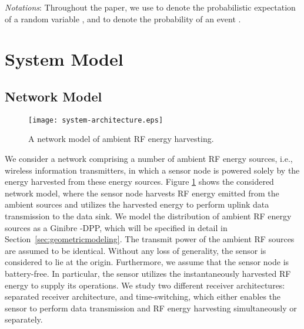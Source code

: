 \documentclass[12pt,draftclsnofoot,onecolumn]{IEEEtran}
\begin{document}
{\em Notations}: Throughout the paper, we use  to denote the probabilistic expectation of a random variable , and  to denote the probability of an event . 


\section{System Model}
\label{sec:systemmodel}





\subsection{Network Model}
\label{sec:network_model}

\begin{figure}
\centering
\texttt{[image: system-architecture.eps]}
\caption{A network model of ambient RF energy harvesting.} \label{fig:systemmodel}
\end{figure}






We consider a network comprising a number of ambient RF energy sources, i.e., wireless information transmitters, in which a sensor node is powered solely by the energy harvested from these energy sources. Figure \ref{fig:systemmodel} shows the considered network model, where the sensor node harvests RF energy emitted from the ambient sources and utilizes the harvested energy to perform  uplink data transmission to the data sink.
We model the distribution of ambient RF energy sources as a Ginibre -DPP, which will be specified in detail in Section~\ref{sec:geometricmodeling}. The transmit power of the ambient RF sources are assumed to be identical. Without any loss of generality, the sensor is considered to lie at the origin. Furthermore, we assume that the sensor node is battery-free. In particular, the sensor utilizes the instantaneously harvested RF energy to supply its operations. 
We study two different receiver architectures: separated receiver architecture, and time-switching, which either enables the sensor to perform data transmission and RF energy harvesting simultaneously or separately. 
\end{document}
